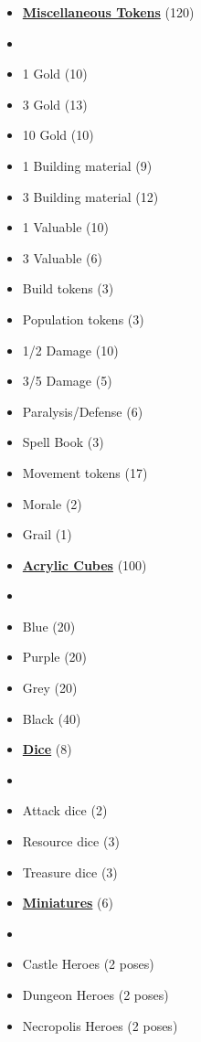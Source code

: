 \begin{multicols*}{3}
\begin{itemize}[leftmargin=0pt, label={}, noitemsep]
  \item \textbf{\small{\underline{Miscellaneous Tokens}}} (120)
  \item
  \item 1 Gold (10)
  \item 3 Gold (13)
  \item 10 Gold (10)
  \item 1 Building material (9)
  \item 3 Building material (12)
  \item 1 Valuable (10)
  \item 3 Valuable (6)
  \item Build tokens (3)
  \item Population tokens (3)
  \item 1/2 Damage (10)
  \item 3/5 Damage (5)
  \item Paralysis/Defense (6)
  \item Spell Book (3)
  \item Movement tokens (17)
  \item Morale (2)
  \item Grail (1)
\end{itemize}
\columnbreak
\begin{itemize}[leftmargin=0pt, label={}, noitemsep]
  \item \textbf{\small{\underline{Acrylic Cubes}}} (100)
  \item
  \item Blue (20)
  \item Purple (20)
  \item Grey (20)
  \item Black (40)
\end{itemize}

\begin{itemize}[leftmargin=0pt, label={}, noitemsep]
  \item \textbf{\small{\underline{Dice}}} (8)
  \item
  \item Attack dice (2)
  \item Resource dice (3)
  \item Treasure dice (3)
\end{itemize}

\begin{itemize}[leftmargin=0pt, label={}, noitemsep]
  \item \textbf{\small{\underline{Miniatures}}} (6)
  \item
  \item Castle Heroes (2 poses)
  \item Dungeon Heroes (2 poses)
  \item Necropolis Heroes (2 poses)
\end{itemize}


\end{multicols*}
